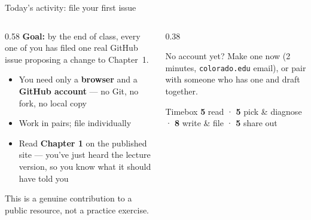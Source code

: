 \documentclass[9pt,aspectratio=169]{beamer}
\begin{document}
\begin{frame}{Today's activity: file your first issue}
    \begin{columns}[T]
        \begin{column}{0.58\textwidth}
            \textbf{Goal:} by the end of class, every one of you has filed one real GitHub issue proposing a change to Chapter~1.

            \vspace{0.75em}

            \begin{itemize}\small
                \item You need only a \textbf{browser} and a \textbf{GitHub account} --- no Git, no fork, no local copy
                \item Work in pairs; file individually
                \item Read \textbf{Chapter 1} on the published site --- you've just heard the lecture version, so you know what it should have told you
            \end{itemize}

            \vspace{0.5em}

            This is a genuine contribution to a public resource, not a practice exercise.
        \end{column}
        \begin{column}{0.38\textwidth}
            \begin{alertblock}{No account yet?}
                \footnotesize Make one now (2 minutes, \texttt{colorado.edu} email), or pair with someone who has one and draft together.
            \end{alertblock}
            \begin{block}{Timebox}
                \footnotesize \textbf{5} read · \textbf{5} pick \& diagnose · \textbf{8} write \& file · \textbf{5} share out
            \end{block}
        \end{column}
    \end{columns}
\end{frame}
\end{document}
